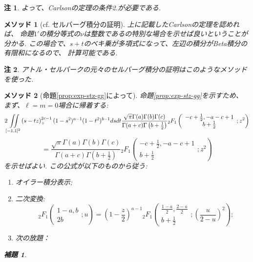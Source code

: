 \documentclass[12pt]{article} %
\newtheorem*{lemma*}{補題}
\newtheorem*{remark*}{\textbf{注}}
\newtheorem{method}{\textbf{メソッド}}
\theoremstyle{remark}
\begin{document}
{\begin{remark*}
	よって、Carlsonの定理の条件2.が必要である.
\end{remark*}
\begin{method}[cf. セルバーグ積分の証明]
	上に記載したCarlsonの定理を認めれば、
命題$1'$の積分等式の$\nu$は整数であるの特別な場合を示せば良いということが分かる.
この場合で、$s+t$のベキ乗が多項式になって、左辺の積分がBeta積分の有限和になるので、
計算可能である.
\end{method}
\begin{remark*}
アトル・セルバークの元々のセルバーグ積分の証明はこのようなメソッドを使った.
\end{remark*}
\begin{method}[命題\ref{prop:exp-stz-gg}によって]
	命題\ref{prop:exp-stz-gg}を示すため、
まず、$\ell=m=0$場合に帰着する:
			\begin{equation*}
				 2\iint\displaylimits_{[-1,1]^2} \left( s-tz \right)_+^{2c-1}  (1 - s^2)^{a - 1} (1 -
				t^2)^{b - 1} d s d t
				\frac{\sqrt{\pi} \Gamma (a) \Gamma (b) \Gamma
			(c)}{\Gamma (a + c) \Gamma \left( b + \frac{1}{2} \right)} {}_2 F_1 \left(
			\begin{array}{c}
				  - c + \frac{1}{2}, - a - c + 1\\
				    b + \frac{1}{2}
			    \end{array} ; z^2 \right)
			\end{equation*}
			\begin{equation} =
				\frac{\sqrt{\pi} \Gamma (a) \Gamma (b) \Gamma
			(c)}{\Gamma (a + c) \Gamma \left( b + \frac{1}{2} \right)} {}_2 F_1 \left(
			\begin{array}{c}
				  - c + \frac{1}{2}, - a - c + 1\\
				    b + \frac{1}{2}
			    \end{array} ; z^2 \right)
				\label{eqn:prop21}
			\end{equation}
			を示せばよい.
	この公式が以下のものから従う:
	\begin{enumerate}
		\item オイラー積分表示;
		\item 二次変換:
			\begin{equation*}
			\quad {}_2 F_1 \left( \begin{array}{c}
				  1 - a, b\\
				    2 b
			    \end{array} ; u \right) = \left( 1 - \frac{z}{2} \right)^{a - 1} {}_2 F_1 \left(
			    \begin{array}{c}
				      \frac{1 - a}{2}, \frac{2 - a}{2}\\
					b + \frac{1}{2}
				\end{array} ; \left( \frac{u}{2 - u} \right)^2 \right);
			\end{equation*}
		\item 次の放題：
	\end{enumerate}
			\begin{lemma*}
				

\end{lemma*}
\end{method}}
\end{document}
